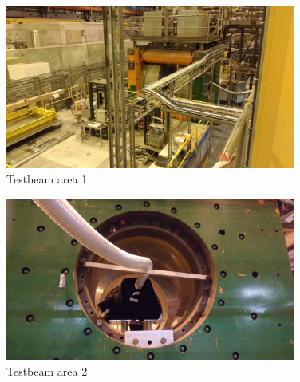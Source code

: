\begin{figure}[p]
	\centering
	\includegraphics[width=0.85\textwidth]{../Pictures/AHCAL-CERN-2017-Area-1.jpg}
	\caption{Testbeam area 1}
	\label{figure:aida/may2017/area-1}
\end{figure}

\begin{figure}[p]
	\centering
	\includegraphics[width=0.85\textwidth]{../Pictures/AHCAL-CERN-2017-Area-2.jpg}
	\caption{Testbeam area 2}
	\label{figure:aida/may2017/area-2}
\end{figure}
